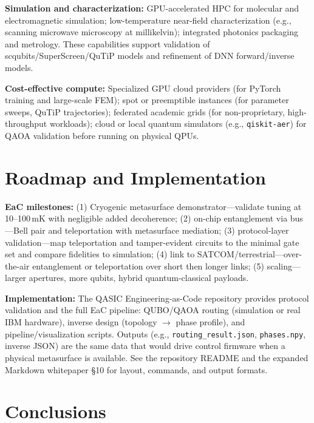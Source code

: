 \documentclass[11pt, a4paper]{article}
\begin{document}
\textbf{Simulation and characterization:} GPU-accelerated HPC for molecular and electromagnetic simulation; low-temperature near-field characterization (e.g., scanning microwave microscopy at millikelvin); integrated photonics packaging and metrology. These capabilities support validation of scqubits/SuperScreen/QuTiP models and refinement of DNN forward/inverse models.

\textbf{Cost-effective compute:} Specialized GPU cloud providers (for PyTorch training and large-scale FEM); spot or preemptible instances (for parameter sweeps, QuTiP trajectories); federated academic grids (for non-proprietary, high-throughput workloads); cloud or local quantum simulators (e.g., \texttt{qiskit-aer}) for QAOA validation before running on physical QPUs.

\section{Roadmap and Implementation}

\textbf{EaC milestones:} (1) Cryogenic metasurface demonstrator---validate tuning at 10--100\,mK with negligible added decoherence; (2) on-chip entanglement via bus---Bell pair and teleportation with metasurface mediation; (3) protocol-layer validation---map teleportation and tamper-evident circuits to the minimal gate set and compare fidelities to simulation; (4) link to SATCOM/terrestrial---over-the-air entanglement or teleportation over short then longer links; (5) scaling---larger apertures, more qubits, hybrid quantum-classical payloads.

\textbf{Implementation:} The QASIC Engineering-as-Code repository provides protocol validation and the full EaC pipeline: QUBO/QAOA routing (simulation or real IBM hardware), inverse design (topology $\to$ phase profile), and pipeline/visualization scripts. Outputs (e.g., \texttt{routing\_result.json}, \texttt{phases.npy}, inverse JSON) are the same data that would drive control firmware when a physical metasurface is available. See the repository README and the expanded Markdown whitepaper §10 for layout, commands, and output formats.

\section{Conclusions}
\end{document}
